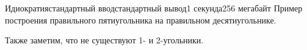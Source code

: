 \begin{problem}{Идиократия}{стандартный ввод}{стандартный вывод}{1 секунда}{256 мегабайт}
Пример построения правильного пятиугольника на правильном десятиугольнике.

Также заметим, что не существуют 1- и 2-угольники.

\end{problem}

